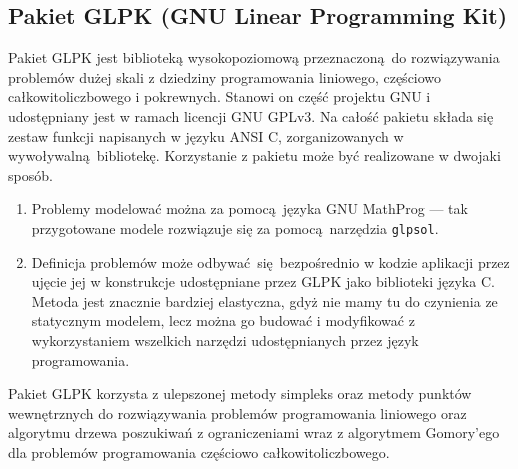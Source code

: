 \subsection{Pakiet GLPK (GNU Linear Programming Kit)} %
\label{ss_internals_glpk}
\par{
  Pakiet GLPK jest biblioteką wysokopoziomową przeznaczoną do rozwiązywania problemów dużej skali z dziedziny programowania liniowego, częściowo całkowitoliczbowego i pokrewnych.
  Stanowi on część projektu GNU i udostępniany jest w ramach licencji GNU GPLv3.
  Na całość pakietu składa się zestaw funkcji napisanych w języku ANSI C, zorganizowanych w wywoływalną bibliotekę.
  Korzystanie z pakietu może być realizowane w dwojaki sposób.
  \begin{enumerate}
    \item Problemy modelować można za pomocą języka GNU MathProg --- tak przygotowane modele rozwiązuje się za pomocą narzędzia \texttt{glpsol}.
    \item Definicja problemów może odbywać się bezpośrednio w kodzie aplikacji przez ujęcie jej w konstrukcje udostępniane przez GLPK jako biblioteki języka C. Metoda jest znacznie bardziej elastyczna, gdyż nie mamy tu do czynienia ze statycznym modelem, lecz można go budować i modyfikować z wykorzystaniem wszelkich narzędzi udostępnianych przez język programowania.
  \end{enumerate}
}
\par{
  Pakiet GLPK korzysta z ulepszonej metody simpleks oraz metody punktów wewnętrznych do rozwiązywania problemów programowania liniowego oraz algorytmu drzewa poszukiwań z ograniczeniami wraz z algorytmem Gomory'ego dla problemów programowania częściowo całkowitoliczbowego.
}
